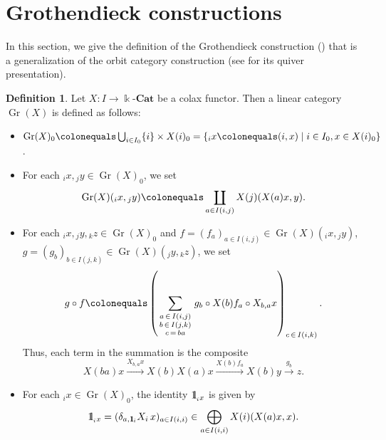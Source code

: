 \documentclass{surv-l}
\numberwithin{equation}{chapter}
\numberwithin{figure}{chapter}
\theoremstyle{plain}
\theoremstyle{definition}
\newtheorem{dfn}[thm]{Definition}
\theoremstyle{remark}
\newcommand{\id}{1\kern-.25em{\text{{\rm l}}}}
\newcommand{\kCat}{\Bbbk\text{-}\mathbf{Cat}}
\DeclareMathOperator{\Gr}{Gr}
\begin{document}
\section{Grothendieck constructions}In this section, we give the definition of the Grothendieck construction
(\cite{Groth}) that is a generalization of the orbit category construction
(see \cite{Asa-Kim2} for its quiver presentation).

\begin{dfn}
Let $X\colon I \to \kCat$ be a colax functor.
Then a linear category $\Gr(X)$ is defined as follows:
\begin{itemize}
\item  $\Gr(X)_0\colonequals  \bigcup_{i\in I_0} \{ i \} \times X(i)_0
= \{{}_ix\colonequals  (i,x) \mid i \in I_0, x \in X(i)_0\}$.
\item  For each ${}_ix, {}_jy \in \Gr(X)_0$, we set
\begin{equation*}
\Gr(X)({}_ix, {}_jy) \colonequals  \coprod_{a\in I(i,j)} X(j)(X(a)x, y).
\end{equation*}
\item  For each ${}_ix, {}_jy, {}_kz \in \Gr(X)_0$ and
$f=(f_a)_{a\in I(i,j)}\in \Gr(X)({}_ix, {}_jy)$,
$g=(g_b)_{b\in I(j,k)}\in \Gr(X)({}_jy, {}_kz)$, we set
\begin{equation*}
g\circ f\colonequals  \left(\sum_{\begin{smallmatrix}a\, \in\, I(i,j)\\b\, \in\, I(j,k)\\c\, =\, ba\end{smallmatrix}}
g_b\circ X(b)f_a
\circ X_{b,a}x \right)_{c\,\in\, I(i,k)}.
\end{equation*}
Thus, each term in the summation is the composite
\begin{equation*}
X(ba)x \xrightarrow{X_{b,a}x} X(b)X(a)x \xrightarrow{X(b)f_a}
X(b)y \xrightarrow{g_b} z.
\end{equation*}
\item For each ${}_ix \in \Gr(X)_0$, the identity $\id_{{}_ix}$ is given by
\begin{equation*}
\id_{{}_ix} = (\delta_{a,\id_i}X_i\,x)_{a\in I(i,i)} \in \bigoplus_{a\in I(i,i)}X(i)(X(a)x,x).
\end{equation*}
\end{itemize}
\end{dfn}
\end{document}
